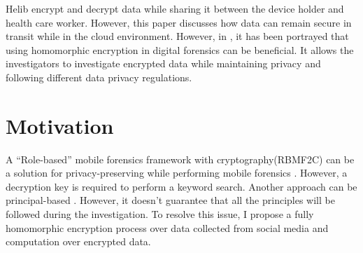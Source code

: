 \documentclass[conference]{IEEEtran}
\begin{document}
Helib encrypt and decrypt data while sharing it between the device holder and health care worker. However, \cite{b17} this paper discusses how data can remain secure in transit while in the cloud environment. However, in \cite{b18}, it has been portrayed that using homomorphic encryption in digital forensics can be beneficial. It allows the investigators to investigate encrypted data while maintaining privacy and following different data privacy regulations.

\section{Motivation}
A “Role-based” mobile forensics framework with cryptography(RBMF2C) can be a solution for privacy-preserving while performing mobile forensics \cite{b19}. However, a decryption key is required to perform a keyword search. Another approach can be principal-based \cite{b20}\cite{b21}. However, it doesn’t guarantee that all the principles will be followed during the investigation. To resolve this issue, I propose a fully homomorphic encryption process over data collected from social media and computation over encrypted data.
\end{document}
